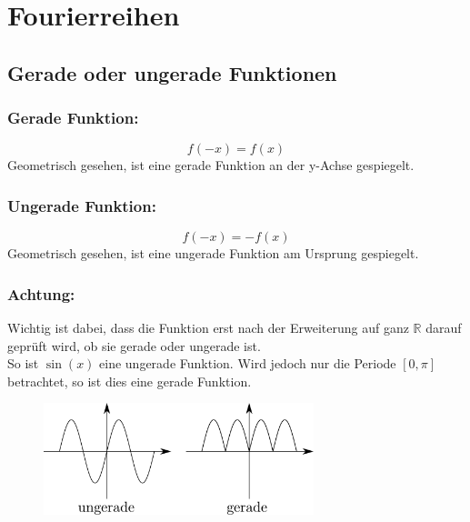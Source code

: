 



\section{Fourierreihen}

\subsection{Gerade oder ungerade Funktionen}

\subsubsection{Gerade Funktion: }
\[ \boxed{f(-x) = f(x)} \]
Geometrisch gesehen, ist eine gerade Funktion an der y-Achse gespiegelt.
\subsubsection{Ungerade Funktion: }
\[ \boxed{f(-x) = -f(x)} \]
Geometrisch gesehen, ist eine ungerade Funktion am Ursprung gespiegelt.
\subsubsection{Achtung: }
Wichtig ist dabei, dass die Funktion erst nach der Erweiterung auf ganz 
$\mathbb{R}$ darauf geprüft wird, ob sie gerade oder ungerade ist. \\
So ist $\sin(x)$ eine ungerade Funktion. Wird jedoch nur die Periode 
$[0, \pi]$ betrachtet, so ist dies eine gerade Funktion.

\begin{figure}[h!]
\centering
\includegraphics[width=0.7\textwidth]{geradeungerade.pdf}
\end{figure}

